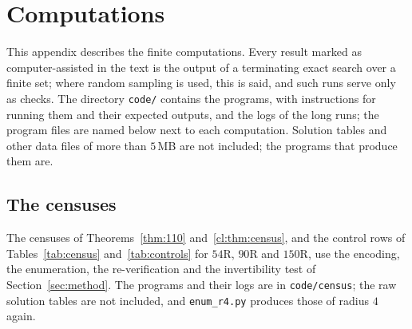 \section{Computations}\label{app:comp}

This appendix describes the finite computations. Every result marked as computer-assisted in the text is the output of a terminating exact search over a finite set; where random sampling is used, this is said, and such runs serve only as checks. The directory \texttt{code/} contains the programs, with instructions for running them and their expected outputs, and the logs of the long runs; the program files are named below next to each computation. Solution tables and other data files of more than $5$\,MB are not included; the programs that produce them are.

\subsection{The censuses}\label{app:census}

The censuses of Theorems~\ref{thm:110} and~\ref{cl:thm:census}, and the control rows of Tables~\ref{tab:census} and~\ref{tab:controls} for $54$R, $90$R and $150$R, use the encoding, the enumeration, the re-verification and the invertibility test of Section~\ref{sec:method}. The programs and their logs are in \texttt{code/census}; the raw solution tables are not included, and \texttt{enum\_r4.py} produces those of radius $4$ again.


